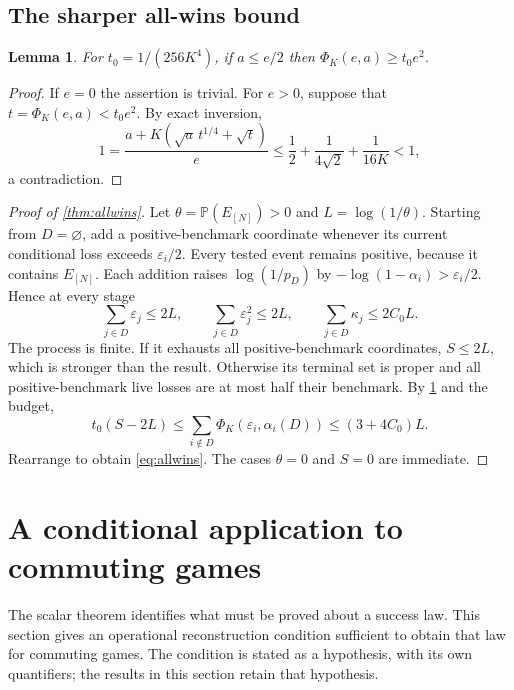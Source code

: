 \documentclass[11pt,reqno]{amsart}
\numberwithin{equation}{section}
\newtheorem{lemma}[theorem]{Lemma}
\theoremstyle{definition}
\theoremstyle{remark}
\newcommand{\Pp}{\mathbb P}
\newcommand{\eps}{\varepsilon}
\newcommand{\PhiK}{\Phi_K}
\begin{document}
\subsection{The sharper all-wins bound}\label{sec:allwins}
\begin{lemma}\label{lem:halfgap}
For \(t_0=1/(256K^4)\), if \(a\le e/2\) then
\(\PhiK(e,a)\ge t_0e^2\).
\end{lemma}
\begin{proof}
If \(e=0\) the assertion is trivial. For \(e>0\), suppose that \(t=\PhiK(e,a)<t_0e^2\). By exact inversion,
\[
 1=\frac{a+K(\sqrt a\,t^{1/4}+\sqrt t)}e
 \le\frac12+\frac1{4\sqrt2}+\frac1{16K}<1,
\]
a contradiction.
\end{proof}
\begin{proof}[Proof of \cref{thm:allwins}]
Let \(\theta=\Pp(E_{[N]})>0\) and \(L=\log(1/\theta)\).
Starting from \(D=\varnothing\), add a positive-benchmark coordinate whenever its current conditional loss exceeds \(\eps_i/2\). Every tested event remains positive, because it contains \(E_{[N]}\). Each addition raises \(\log(1/p_D)\) by
\(-\log(1-\alpha_i)>\eps_i/2\). Hence at every stage
\[
 \sum_{j\in D}\eps_j\le2L,\qquad
 \sum_{j\in D}\eps_j^2\le2L,\qquad
 \sum_{j\in D}\kappa_j\le2C_0L.
\]
The process is finite. If it exhausts all positive-benchmark coordinates, \(S\le2L\), which is stronger than the result. Otherwise its terminal set is proper and all positive-benchmark live losses are at most half their benchmark. By \cref{lem:halfgap} and the budget,
\[
 t_0(S-2L)\le
 \sum_{i\notin D}\PhiK(\eps_i,\alpha_i(D))
 \le(3+4C_0)L.
\]
Rearrange to obtain \eqref{eq:allwins}. The cases \(\theta=0\) and \(S=0\) are immediate.
\end{proof}



\section{A conditional application to commuting games}\label{sec:games}
The scalar theorem identifies what must be proved about a success law. This section gives an operational reconstruction condition sufficient to obtain that law for commuting games. The condition is stated as a hypothesis, with its own quantifiers; the results in this section retain that hypothesis.
\end{document}
